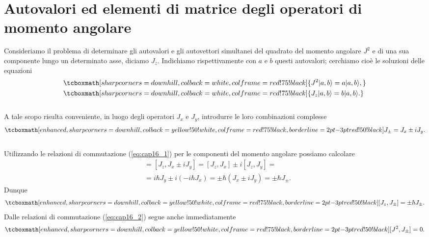 \documentclass[a4paper,12pt,oneside]{book}
\begin{document}
\section[Autovalori ed elementi di matrice degli operatori di momento angolare]{Autovalori ed elementi di matrice degli operatori di momento angolare}
Consideriamo il problema di determinare gli autovalori e gli autovettori simultanei del quadrato del momento angolare $J^2$ e di una sua componente lungo un determinato asse, diciamo $J_z$. Indichiamo rispettivamente con $a$ e $b$ questi autovalori;  cerchiamo cioè le soluzioni delle equazioni
	\begin{align}
		&\tcboxmath[sharp corners=downhill, colback=white, colframe=red!75!black]{ J^2 \vert a, b \rangle = a \vert a, b \rangle ,} \\
		& \tcboxmath[sharp corners=downhill, colback=white, colframe=red!75!black]{J_z \vert a, b \rangle = b \vert a, b \rangle .}
	\end{align}\\
	
A tale scopo risulta conveniente, in luogo degli operatori $J_x$ e $J_y$, introdurre le loro combinazioni complesse
	\begin{equation}
		\tcboxmath[enhanced, sharp corners=downhill, colback=yellow!50!white, colframe=red!75!black, borderline={2pt}{-3pt}{red!50!black}]{
			J_{\pm} = J_x \pm i J_y .
			}
	\end{equation}\\
Utilizzando le relazioni di commutazione (\ref{eq:cap16_1}) per le componenti del momento angolare possiamo calcolare
	\begin{align}
		[J_z , J_{\pm}] & =  [J_z , J_x \pm i J_y] = [J_z , J_x] \pm i [J_z ,J_y] = \nonumber \\
		& = i\hbar J_y \pm i (-i\hbar J_x) = \pm \hbar (J_x \pm i J_y ) = \pm \hbar J_{\pm} .
	\end{align}
Dunque
	\begin{equation}
		\tcboxmath[enhanced, sharp corners=downhill, colback=yellow!50!white, colframe=red!75!black, borderline={2pt}{-3pt}{red!50!black}]{
			[J_z , J_{\pm}] = \pm \hbar J_{\pm} .
			}
	\label{eq:cap16_3}
	\end{equation}
Dalle relazioni di commutazione (\ref{eq:cap16_2}) segue anche immediatamente
	\begin{equation}
		\tcboxmath[enhanced, sharp corners=downhill, colback=yellow!50!white, colframe=red!75!black, borderline={2pt}{-3pt}{red!50!black}]{
			[J^2 , J_{\pm}]=0 .
			}
	\label{eq:cap16_4}
	\end{equation}\\
	
\end{document}
